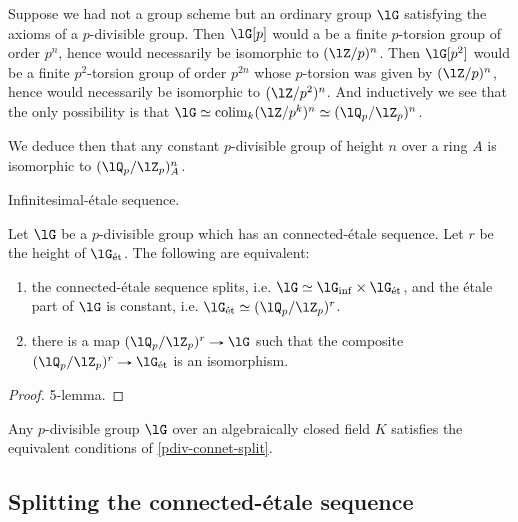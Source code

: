 \begin{example}
  Suppose we had not a group scheme but an ordinary group $\lG$
  satisfying the axioms of a $p$-divisible group. Then $\lG[p]$ would
  a be a finite $p$-torsion group of order $p^n$, hence would
  necessarily be isomorphic to $(\lZ/p)^n$. Then $\lG[p^2]$ would be a
  finite $p^2$-torsion group of order $p^{2n}$ whose $p$-torsion was
  given by $(\lZ/p)^n$, hence would necessarily be isomorphic to
  $(\lZ/p^2)^n$. And inductively we see that the only possibility is
  that $\lG \iso \colim_k (\lZ/p^k)^n \iso (\lQ_p/\lZ_p)^n$.

  We deduce then that any constant $p$-divisible group of height $n$
  over a ring $A$ is isomorphic to $(\lQ_p/\lZ_p)^n_A$.
\end{example}



\begin{proposition}
  \label{pdiv-connet}
  Infinitesimal-\'etale sequence.
\end{proposition}

\begin{proposition}
  \label{pdiv-connet-split}
  Let $\lG$ be a $p$-divisible group which has an connected-\'etale
  sequence. Let $r$ be the height of $\lG_\et$. The following are
  equivalent:
  \begin{enumerate}
  \item the connected-\'etale sequence splits, i.e.
    $\lG \iso \lG_\inf \times \lG_\et$, and the \'etale part of $\lG$
    is constant, i.e. $\lG_\et \iso (\lQ_p/\lZ_p)^r$.
  \item there is a map $(\lQ_p/\lZ_p)^r \to \lG$ such that the
    composite $(\lQ_p/\lZ_p)^r \to \lG_\et$ is an isomorphism.
  \end{enumerate}
\end{proposition}

\begin{proof}
  5-lemma.
\end{proof}

\begin{proposition}
  \label{pdiv-algcl}
  Any $p$-divisible group $\lG$ over an algebraically closed field $K$
  satisfies the equivalent conditions of \cref{pdiv-connet-split}.
\end{proposition}

\subsection{Splitting the connected-\'etale sequence}
\label{pdiv-split}

